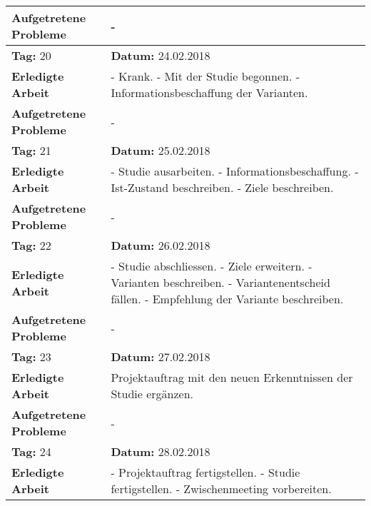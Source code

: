 \begin{longtable}{|p{5cm}|p{5cm}p{6cm}|}
\textbf{Aufgetretene Probleme} & \multicolumn{2}{p{11cm}|}{-} \\ \hline
\rowcolor{heading}\textbf{Tag:} 20 & \textbf{Datum:} 24.02.2018 & \\ \hline
\textbf{Erledigte Arbeit} & \multicolumn{2}{p{11cm}|}{- Krank. \newline
- Mit der Studie begonnen. \newline
- Informationsbeschaffung der Varianten.} \\ \hline
\textbf{Aufgetretene Probleme} & \multicolumn{2}{p{11cm}|}{-} \\ \hline
\rowcolor{heading}\textbf{Tag:} 21 & \textbf{Datum:} 25.02.2018 & \\ \hline
\textbf{Erledigte Arbeit} & \multicolumn{2}{p{11cm}|}{- Studie ausarbeiten. \newline
- Informationsbeschaffung. \newline
- Ist-Zustand beschreiben. \newline
- Ziele beschreiben.} \\ \hline
\textbf{Aufgetretene Probleme} & \multicolumn{2}{p{11cm}|}{-} \\ \hline
\rowcolor{heading}\textbf{Tag:} 22 & \textbf{Datum:} 26.02.2018 & \\ \hline
\textbf{Erledigte Arbeit} & \multicolumn{2}{p{11cm}|}{- Studie abschliessen. \newline
- Ziele erweitern. \newline
- Varianten beschreiben. \newline
- Variantenentscheid fällen. \newline
- Empfehlung der Variante beschreiben.} \\ \hline
\textbf{Aufgetretene Probleme} & \multicolumn{2}{p{11cm}|}{-} \\ \hline
\rowcolor{heading}\textbf{Tag:} 23 & \textbf{Datum:} 27.02.2018 & \\ \hline
\textbf{Erledigte Arbeit} & \multicolumn{2}{p{11cm}|}{Projektauftrag mit den neuen Erkenntnissen der Studie ergänzen.} \\ \hline
\textbf{Aufgetretene Probleme} & \multicolumn{2}{p{11cm}|}{-} \\ \hline
\rowcolor{heading}\textbf{Tag:} 24 & \textbf{Datum:} 28.02.2018 & \\ \hline
\textbf{Erledigte Arbeit} & \multicolumn{2}{p{11cm}|}{- Projektauftrag fertigstellen. \newline
- Studie fertigstellen.
- Zwischenmeeting vorbereiten.} \\ \hline

\end{longtable}

